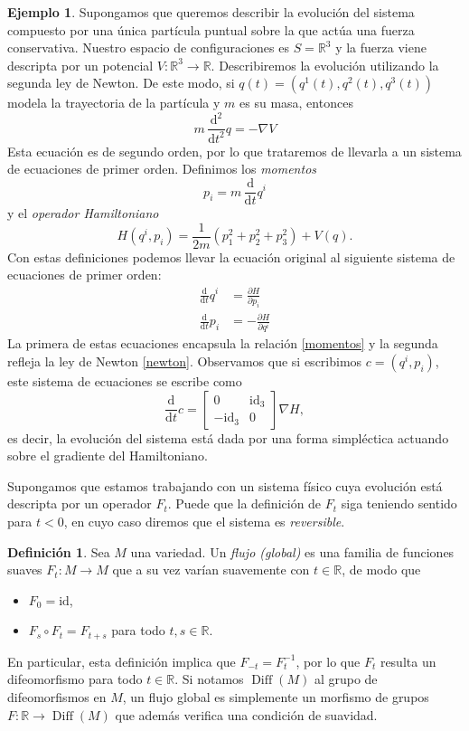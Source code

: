 \documentclass[11pt, a4paper]{article}
\newcommand{\RR}{\mathbb{R}}
\newcommand{\id}{\mathrm{id}}
\DeclareMathOperator{\Diff}{Diff}
\theoremstyle{plain}
\theoremstyle{definition}
\newtheorem{defn}[prop]{Definición}
\newtheorem{exmp}[prop]{Ejemplo}
\begin{document}
\begin{exmp} \label{ej-hamilton} Supongamos que queremos describir la evolución del sistema compuesto por una única partícula puntual sobre la que actúa una fuerza conservativa. Nuestro espacio de configuraciones es $S=\RR^3$ y la fuerza viene descripta por un potencial $V:\RR^3\to \RR$. Describiremos la evolución utilizando la segunda ley de Newton. De este modo, si $q(t)=(q^1(t),q^2(t),q^3(t))$ modela la trayectoria de la partícula y $m$ es su masa, entonces
\begin{equation}\label{newton}
m\,\frac{\mathrm{d}^2}{\mathrm{d}t^2} q= -\nabla V
\end{equation}
Esta ecuación es de segundo orden, por lo que trataremos de llevarla a un sistema de ecuaciones de primer orden. Definimos los \emph{momentos}
\begin{equation}\label{momentos}
p_i= m\,\frac{\mathrm{d}}{\mathrm{d}t}q^i
\end{equation}
y el \emph{operador Hamiltoniano}
\[H(q^i,p_i)= \frac{1}{2m}(p_1^2+p_2^2+p_3^2)+V(q).\]
Con estas definiciones podemos llevar la ecuación original al siguiente sistema de ecuaciones de primer orden:
\begin{align*}
\frac{\mathrm{d}}{\mathrm{d}t}q^i &= \frac{\partial H}{\partial p_i}\\
\frac{\mathrm{d}}{\mathrm{d}t}p_i &= -\frac{\partial H}{\partial q^i}
\end{align*}
La primera de estas ecuaciones encapsula la relación \eqref{momentos} y la segunda refleja la ley de Newton \eqref{newton}. Observamos que si escribimos $c=(q^i,p_i)$, este sistema de ecuaciones se escribe como
\[\frac{\mathrm{d}}{\mathrm{d}t}c=\begin{bmatrix}
    0 &\id_3\\
    -\id_3 & 0
\end{bmatrix}\nabla H,\]
es decir, la evolución del sistema está dada por una forma simpléctica actuando sobre el gradiente del Hamiltoniano.
\end{exmp}

Supongamos que estamos trabajando con un sistema físico cuya evolución está descripta por un operador $F_t$. Puede que la definición de $F_t$ siga teniendo sentido para $t<0$, en cuyo caso diremos que el sistema es \emph{reversible}.
\begin{defn} Sea $M$ una variedad. Un \emph{flujo (global)} es una familia de funciones suaves $F_t:M\to M$ que a su vez varían suavemente con $t\in \RR$, de modo que
\begin{itemize}
\item $F_0=\id$,
\item $F_s\circ F_t = F_{t+s}$ para todo $t,s\in \RR$.
\end{itemize}
En particular, esta definición implica que $F_{-t}=F_t^{-1}$, por lo que $F_t$ resulta un difeomorfismo para todo $t\in\RR$. Si notamos $\Diff(M)$ al grupo de difeomorfismos en $M$, un flujo global es simplemente un morfismo de grupos $F:\RR\to\Diff(M)$ que además verifica una condición de suavidad.
\end{defn}
\end{document}
